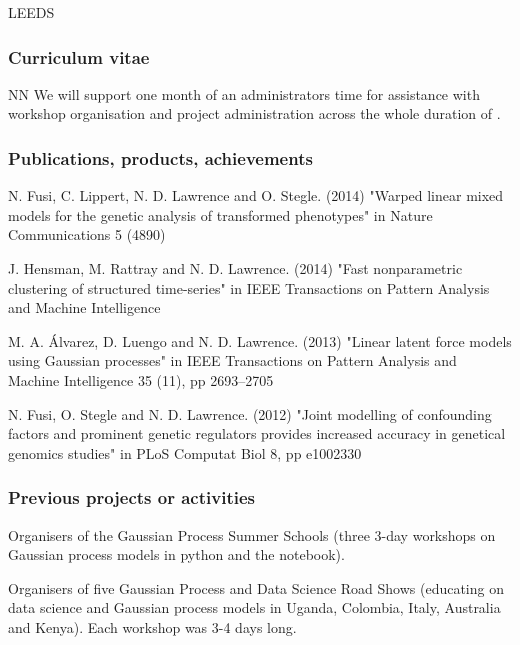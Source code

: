 \begin{sitedescription}{LEEDS}
\subsubsection*{Curriculum vitae}


%




\begin{participant}[type=res,PM=1]{NN}
  We will support one month of an administrators time for assistance
  with workshop organisation and project administration across the
  whole duration of \TheProject.
\end{participant}


%

\subsubsection*{Publications, products, achievements}

\begin{compactenum}
\item N. Fusi, C. Lippert, N. D. Lawrence and O. Stegle. (2014) "Warped linear mixed models for the genetic analysis of transformed phenotypes" in Nature Communications 5 (4890)
\item J. Hensman, M. Rattray and N. D. Lawrence. (2014) "Fast nonparametric clustering of structured time-series" in IEEE Transactions on Pattern Analysis and Machine Intelligence
\item M. A. \'Alvarez, D. Luengo and N. D. Lawrence. (2013) "Linear latent force models using Gaussian processes" in IEEE Transactions on Pattern Analysis and Machine Intelligence 35 (11), pp 2693--2705
\item N. Fusi, O. Stegle and N. D. Lawrence. (2012) "Joint modelling of confounding factors and prominent genetic regulators provides increased accuracy in genetical genomics studies" in PLoS Computat Biol 8, pp e1002330
\end{compactenum}

\subsubsection*{Previous projects or activities}

\begin{compactenum}
\item Organisers of the Gaussian Process Summer Schools (three 3-day workshops on Gaussian process models in python and the \IPython notebook).
\item Organisers of five Gaussian Process and Data Science Road Shows (educating on data science and Gaussian process models in Uganda, Colombia, Italy, Australia and Kenya). Each workshop was 3-4 days long.
\end{compactenum}


\end{sitedescription}
